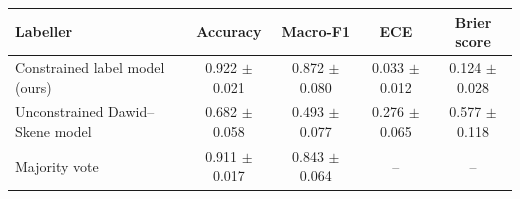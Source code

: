 \documentclass[11pt,a4paper]{article}
\makeatletter
\newenvironment{stable}{\par\addvspace{8pt}\noindent\begin{minipage}{\textwidth}\def\@captype{table}\centering}{\end{minipage}\par\addvspace{8pt}}
\makeatother
\begin{document}
\begin{stable}
\caption{Recovery of known classes. Classes and votes are simulated for the 327 real items from the fitted constrained model, the label models are refitted on the simulated votes, and the recovered labels are scored against the simulated classes (mean $\pm$ s.d. over the simulation runs; ECE with 10 equal-width bins).}\label{tab:s-recovery}
\footnotesize\setlength{\tabcolsep}{4pt}
\begin{tabular}{@{}l c c c c@{}}
\toprule
Labeller & Accuracy & Macro-F1 & ECE & Brier score \\
\midrule
Constrained label model (ours) & 0.922 $\pm$ 0.021 & 0.872 $\pm$ 0.080 & 0.033 $\pm$ 0.012 & 0.124 $\pm$ 0.028 \\
Unconstrained Dawid--Skene model & 0.682 $\pm$ 0.058 & 0.493 $\pm$ 0.077 & 0.276 $\pm$ 0.065 & 0.577 $\pm$ 0.118 \\
Majority vote & 0.911 $\pm$ 0.017 & 0.843 $\pm$ 0.064 & -- & -- \\
\bottomrule
\end{tabular}
\end{stable}
\end{document}
